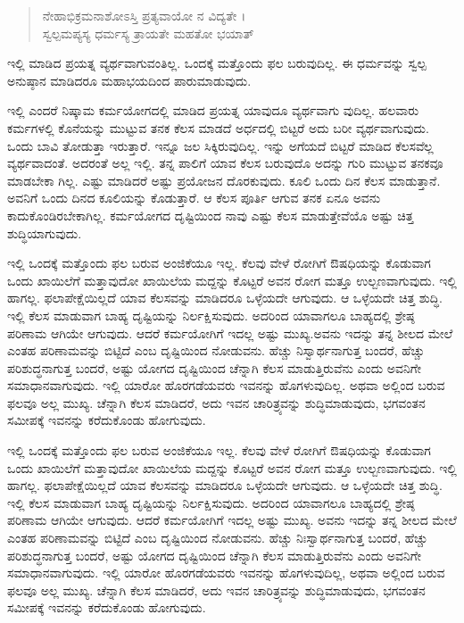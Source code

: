 \begin{verse}
ನೇಹಾಭಿಕ್ರಮನಾಶೋಽಸ್ತಿ ಪ್ರತ್ಯವಾಯೋ ನ ವಿದ್ಯತೇ ।\\ಸ್ವಲ್ಪಮಪ್ಯಸ್ಯ ಧರ್ಮಸ್ಯ ತ್ರಾಯತೇ ಮಹತೋ ಭಯಾತ್ 
\end{verse}

{\small ಇಲ್ಲಿ ಮಾಡಿದ ಪ್ರಯತ್ನ ವ್ಯರ್ಥವಾಗುವಂತಿಲ್ಲ. ಒಂದಕ್ಕೆ ಮತ್ತೊಂದು ಫಲ ಬರುವುದಿಲ್ಲ. ಈ ಧರ್ಮವನ್ನು ಸ್ವಲ್ಪ ಅನುಷ್ಠಾನ ಮಾಡಿದರೂ ಮಹಾಭಯದಿಂದ ಪಾರುಮಾಡುವುದು.}

ಇಲ್ಲಿ ಎಂದರೆ ನಿಷ್ಕಾಮ ಕರ್ಮಯೋಗದಲ್ಲಿ ಮಾಡಿದ ಪ್ರಯತ್ನ ಯಾವುದೂ ವ್ಯರ್ಥವಾಗು ವುದಿಲ್ಲ. ಹಲವಾರು ಕರ್ಮಗಳಲ್ಲಿ ಕೊನೆಯನ್ನು ಮುಟ್ಟುವ ತನಕ ಕೆಲಸ ಮಾಡದೆ ಅರ್ಧದಲ್ಲಿ ಬಿಟ್ಟರೆ ಅದು ಬರೀ ವ್ಯರ್ಥವಾಗುವುದು. ಒಂದು ಬಾವಿ ತೋಡುತ್ತಾ ಇರುತ್ತಾರೆ. ಇನ್ನೂ ಜಲ ಸಿಕ್ಕಿರುವುದಿಲ್ಲ. ಇನ್ನು ಅಗೆಯದೆ ಬಿಟ್ಟರೆ ಮಾಡಿದ ಕೆಲಸವೆಲ್ಲ ವ್ಯರ್ಥವಾದಂತೆ. ಅದರಂತೆ ಅಲ್ಲ ಇಲ್ಲಿ. ತನ್ನ ಪಾಲಿಗೆ ಯಾವ ಕೆಲಸ ಬರುವುದೊ ಅದನ್ನು ಗುರಿ ಮುಟ್ಟುವ ತನಕವೂ ಮಾಡಬೇಕಾ ಗಿಲ್ಲ. ಎಷ್ಟು ಮಾಡಿದರೆ ಅಷ್ಟು ಪ್ರಯೋಜನ ದೊರಕುವುದು. ಕೂಲಿ ಒಂದು ದಿನ ಕೆಲಸ ಮಾಡುತ್ತಾನೆ. ಅವನಿಗೆ ಒಂದು ದಿನದ ಕೂಲಿಯನ್ನು ಕೊಡುತ್ತಾರೆ. ಆ ಕೆಲಸ ಪೂರ್ತಿ ಆಗುವ ತನಕ ಏನೂ ಅವನು ಕಾದುಕೊಂಡಿರಬೇಕಾಗಿಲ್ಲ. ಕರ್ಮಯೋಗದ ದೃಷ್ಟಿಯಿಂದ ನಾವು ಎಷ್ಟು ಕೆಲಸ ಮಾಡುತ್ತೇವೆಯೊ ಅಷ್ಟು ಚಿತ್ತ ಶುದ್ಧಿಯಾಗುವುದು.

ಇಲ್ಲಿ ಒಂದಕ್ಕೆ ಮತ್ತೊಂದು ಫಲ ಬರುವ ಅಂಜಿಕೆಯೂ ಇಲ್ಲ. ಕೆಲವು ವೇಳೆ ರೋಗಿಗೆ ಔಷಧಿಯನ್ನು ಕೊಡುವಾಗ ಒಂದು ಖಾಯಿಲೆಗೆ ಮತ್ತಾವುದೋ ಖಾಯಿಲೆಯ ಮದ್ದನ್ನು ಕೊಟ್ಟರೆ ಅವನ ರೋಗ ಮತ್ತೂ ಉಲ್ಬಣವಾಗುವುದು. ಇಲ್ಲಿ ಹಾಗಲ್ಲ. ಫಲಾಪೇಕ್ಷೆಯಿಲ್ಲದೆ ಯಾವ ಕೆಲಸವನ್ನು ಮಾಡಿದರೂ ಒಳ್ಳೆಯದೇ ಆಗುವುದು. ಆ ಒಳ್ಳೆಯದೇ ಚಿತ್ತ ಶುದ್ಧಿ. ಇಲ್ಲಿ ಕೆಲಸ ಮಾಡುವಾಗ ಬಾಹ್ಯ ದೃಷ್ಟಿಯನ್ನು ನಿರ್ಲಕ್ಷಿಸುವುದು. ಅದರಿಂದ ಯಾವಾಗಲೂ ಬಾಹ್ಯದಲ್ಲಿ ಶ್ರೇಷ್ಠ ಪರಿಣಾಮ ಆಗಿಯೇ ಆಗುವುದು. ಆದರೆ ಕರ್ಮಯೋಗಿಗೆ ಇದಲ್ಲ ಅಷ್ಟು ಮುಖ್ಯ.ಅವನು ಇದನ್ನು ತನ್ನ ಶೀಲದ ಮೇಲೆ ಎಂತಹ ಪರಿಣಾಮವನ್ನು ಬಿಟ್ಟಿದೆ ಎಂಬ ದೃಷ್ಟಿಯಿಂದ ನೋಡುವನು. ಹೆಚ್ಚು ನಿಸ್ವಾರ್ಥನಾಗುತ್ತ ಬಂದರೆ, ಹೆಚ್ಚು ಪರಿಶುದ್ಧನಾಗುತ್ತ ಬಂದರೆ, ಅಷ್ಟು ಯೋಗದ ದೃಷ್ಟಿಯಿಂದ ಚೆನ್ನಾಗಿ ಕೆಲಸ ಮಾಡುತ್ತಿರುವೆನು ಎಂದು ಅವನಿಗೇ ಸಮಾಧಾನವಾಗುವುದು. ಇಲ್ಲಿ ಯಾರೋ ಹೊರಗಡೆಯವರು ಇವನನ್ನು ಹೊಗಳುವುದಿಲ್ಲ. ಅಥವಾ ಅಲ್ಲಿಂದ ಬರುವ ಫಲವೂ ಅಲ್ಲ ಮುಖ್ಯ. ಚೆನ್ನಾಗಿ ಕೆಲಸ ಮಾಡಿದರೆ, ಅದು ಇವನ ಚಾರಿತ್ರ್ಯವನ್ನು ಶುದ್ಧಿಮಾಡುವುದು, ಭಗವಂತನ ಸಮೀಪಕ್ಕೆ ಇವನನ್ನು ಕರೆದುಕೊಂಡು ಹೋಗುವುದು.

ಇಲ್ಲಿ ಒಂದಕ್ಕೆ ಮತ್ತೊಂದು ಫಲ ಬರುವ ಅಂಜಿಕೆಯೂ ಇಲ್ಲ. ಕೆಲವು ವೇಳೆ ರೋಗಿಗೆ ಔಷಧಿಯನ್ನು ಕೊಡುವಾಗ ಒಂದು ಖಾಯಿಲೆಗೆ ಮತ್ತಾವುದೋ ಖಾಯಿಲೆಯ ಮದ್ದನ್ನು ಕೊಟ್ಟರೆ ಅವನ ರೋಗ ಮತ್ತೂ ಉಲ್ಬಣವಾಗುವುದು. ಇಲ್ಲಿ ಹಾಗಲ್ಲ. ಫಲಾಪೇಕ್ಷೆಯಿಲ್ಲದೆ ಯಾವ ಕೆಲಸವನ್ನು ಮಾಡಿದರೂ ಒಳ್ಳೆಯದೇ ಆಗುವುದು. ಆ ಒಳ್ಳೆಯದೇ ಚಿತ್ತ ಶುದ್ಧಿ. ಇಲ್ಲಿ ಕೆಲಸ ಮಾಡುವಾಗ ಬಾಹ್ಯ ದೃಷ್ಟಿಯನ್ನು ನಿರ್ಲಕ್ಷಿಸುವುದು. ಅದರಿಂದ ಯಾವಾಗಲೂ ಬಾಹ್ಯದಲ್ಲಿ ಶ್ರೇಷ್ಠ ಪರಿಣಾಮ ಆಗಿಯೇ ಆಗುವುದು. ಆದರೆ ಕರ್ಮಯೋಗಿಗೆ ಇದಲ್ಲ ಅಷ್ಟು ಮುಖ್ಯ. ಅವನು ಇದನ್ನು ತನ್ನ ಶೀಲದ ಮೇಲೆ ಎಂತಹ ಪರಿಣಾಮವನ್ನು ಬಿಟ್ಟಿದೆ ಎಂಬ ದೃಷ್ಟಿಯಿಂದ ನೋಡುವನು. ಹೆಚ್ಚು ನಿಃಸ್ವಾರ್ಥನಾಗುತ್ತ ಬಂದರೆ, ಹೆಚ್ಚು ಪರಿಶುದ್ಧನಾಗುತ್ತ ಬಂದರೆ, ಅಷ್ಟು ಯೋಗದ ದೃಷ್ಟಿಯಿಂದ ಚೆನ್ನಾಗಿ ಕೆಲಸ ಮಾಡುತ್ತಿರುವೆನು ಎಂದು ಅವನಿಗೇ ಸಮಾಧಾನವಾಗುವುದು. ಇಲ್ಲಿ ಯಾರೋ ಹೊರಗಡೆಯವರು ಇವನನ್ನು ಹೊಗಳುವುದಿಲ್ಲ, ಅಥವಾ ಅಲ್ಲಿಂದ ಬರುವ ಫಲವೂ ಅಲ್ಲ ಮುಖ್ಯ. ಚೆನ್ನಾಗಿ ಕೆಲಸ ಮಾಡಿದರೆ, ಅದು ಇವನ ಚಾರಿತ್ರ್ಯವನ್ನು ಶುದ್ಧಿಮಾಡುವುದು, ಭಗವಂತನ ಸಮೀಪಕ್ಕೆ ಇವನನ್ನು ಕರೆದುಕೊಂಡು ಹೋಗುವುದು.

